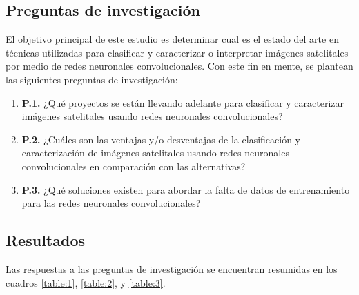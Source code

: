 \subsection{Preguntas de investigación}

El objetivo principal de este estudio es determinar cual es el estado del arte en técnicas utilizadas para clasificar y
caracterizar o interpretar imágenes satelitales por medio de redes neuronales convolucionales. Con este fin en mente,
se plantean las siguientes preguntas de investigación:

\begin{enumerate}
    \item[] {\bf P.1.} ¿Qué proyectos se están llevando adelante para clasificar y caracterizar imágenes satelitales
        usando redes neuronales convolucionales?
    \item[] {\bf P.2.} ¿Cuáles son las ventajas y/o desventajas de la clasificación y caracterización de imágenes
        satelitales usando redes neuronales convolucionales en comparación con las alternativas?
    \item[] {\bf P.3.} ¿Qué soluciones existen para abordar la falta de datos de entrenamiento para las redes
        neuronales convolucionales?
\end{enumerate}

\subsection{Resultados}

Las respuestas a las preguntas de investigación se encuentran resumidas en los cuadros \ref{table:1}, \ref{table:2}, y
\ref{table:3}.


